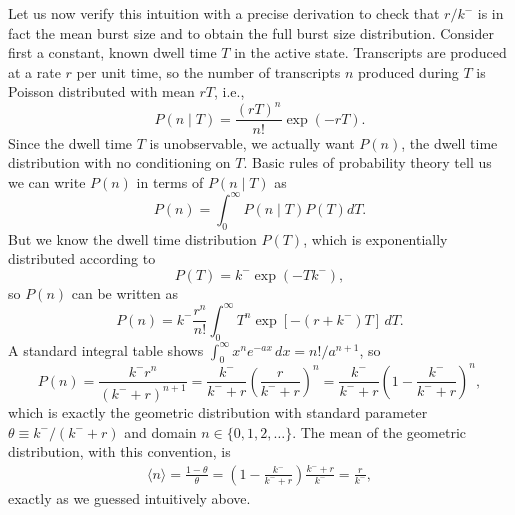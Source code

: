 Let us now verify this intuition with a precise derivation to check that $r/k^-$
is in fact the mean burst size and to obtain the full burst size distribution.
Consider first a constant, known dwell time $T$ in the active state. Transcripts
are produced at a rate $r$ per unit time, so the number of transcripts $n$
produced during $T$ is Poisson distributed with mean $rT$, i.e.,
\begin{equation}
    P(n\mid T) = \frac{(rT)^n}{n!} \exp(-rT).
\end{equation}
Since the dwell time $T$ is unobservable, we actually want $P(n)$, the dwell
time distribution with no conditioning on $T$. Basic rules of probability theory
tell us we can write $P(n)$ in terms of $P(n\mid T)$ as
\begin{equation}
    P(n) =\int_0^\infty P(n\mid T) P(T) dT.
\end{equation}
But we know the dwell time distribution $P(T)$, which is exponentially
distributed according to
\begin{equation}
    P(T) = k^- \exp(-T k^-),
\end{equation}
so $P(n)$ can be written as
\begin{equation}
    P(n) = k^- \frac{r^n}{n!}
            \int_0^\infty T^n\exp[-(r + k^-)T]\,dT.
\end{equation}
A standard integral table shows $\int_0^\infty x^n e^{-ax}\,dx = n!/a^{n+1}$, so
\begin{equation}
    P(n) = \frac{k^- r^n}{(k^- + r)^{n+1}}
        = \frac{k^-}{k^- + r}
            \left(\frac{r}{k^- + r}\right)^n
        = \frac{k^-}{k^- + r}
            \left(1 - \frac{k^-}{k^- + r}\right)^n,
\end{equation}
which is exactly the geometric distribution with standard parameter
$\theta\equiv k^-/(k^- + r)$ and domain $n \in \{0, 1, 2, \dots\}$.
The mean of the geometric distribution, with this convention, is
\begin{align}
\langle n\rangle = \frac{1 - \theta}{\theta}
        = \left(1 - \frac{k^-}{k^- + r}\right)
                    \frac{k^- + r}{k^-}
        = \frac{r}{k^-},
\end{align}
exactly as we guessed intuitively above.

